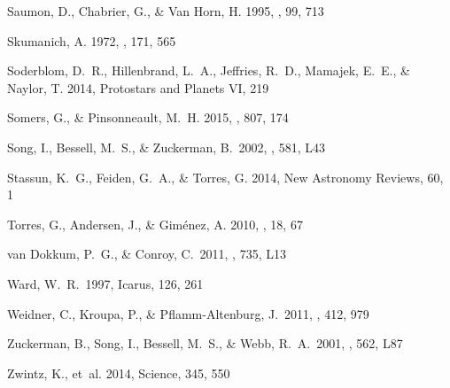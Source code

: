 \begin{thebibliography}{56}
Saumon, D., Chabrier, G., \& {Van Horn}, H. 1995, \apjs, 99, 713

Skumanich, A. 1972, \apj, 171, 565

{Soderblom}, D.~R., {Hillenbrand}, L.~A., {Jeffries}, R.~D., {Mamajek}, E.~E.,
  \& {Naylor}, T. 2014, Protostars and Planets VI, 219

{Somers}, G., \& {Pinsonneault}, M.~H. 2015, \apj, 807, 174

 Song, I., Bessell, M.~S., \& Zuckerman, B.\ 2002, \apjl, 581, L43

{Stassun}, K.~G., {Feiden}, G.~A., \& {Torres}, G. 2014, New Astronomy Reviews,
  60, 1

Torres, G., Andersen, J., \& Gim\'{e}nez, A. 2010, \aapr, 18, 67

 van Dokkum, P.~G., \& Conroy, C.\ 2011, \apjl, 735, L13 

 Ward, W.~R.\ 1997, Icarus, 126, 261 

 Weidner, C., Kroupa, P., \& Pflamm-Altenburg, J.\ 2011, \mnras, 412, 979

 Zuckerman, B., Song, I., Bessell, M.~S., \& Webb, R.~A.\ 2001, \apjl, 562, L87

{Zwintz}, K., {et~al.} 2014, Science, 345, 550

\end{thebibliography}
